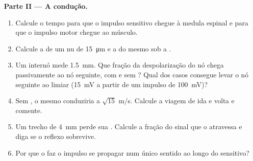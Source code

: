 \begin{problem}
\medskip
\noindent\textbf{Parte II --- A condução.}
\begin{enumerate}[resume]
  \item Calcule o tempo para que o impulso sensitivo chegue à medula
        espinal e para que o impulso motor chegue ao músculo.
  \item Calcule a  de um  nu de
        \qty{15}{\micro m} e a do mesmo  sob a .
  \item Um internó mede \qty{1.5}{mm}. Que fração da despolarização do
        nó chega passivamente ao nó seguinte, com e sem ? Qual dos
        casos consegue levar o nó seguinte ao limiar (\qty{15}{mV} a
        partir de um impulso de \qty{100}{mV})?
  \item Sem , o mesmo  conduziria a $\sqrt{15}$
        m/s. Calcule a viagem de ida e volta e comente.
  \item Um trecho de \qty{4}{mm} perde sua . Calcule a fração do
        sinal que o atravessa e diga se o reflexo sobrevive.
  \item Por que o  faz o impulso se propagar num único
        sentido ao longo do  sensitivo?
\end{enumerate}


\end{problem}
